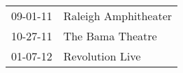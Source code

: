 \begin{supertabular}{p{0.25\columnwidth}p{0.75\columnwidth}}
 09-01-11 &  Raleigh Amphitheater \\
 10-27-11 &      The Bama Theatre \\
 01-07-12 &       Revolution Live \\
\end{supertabular}
